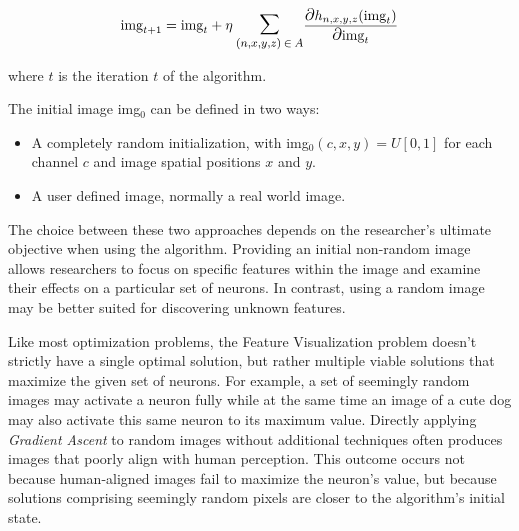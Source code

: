 \begin{equation}
    \text{img}_{t + 1} = \text{img}_t + \eta \: \mathlarger{\mathlarger{\sum}}_{(n, x, y, z) \: \in \: A} \frac{\mathlarger{\mathlarger{\partial}} h_{n, x, y, z} (\text{img}_t)}{\mathlarger{\mathlarger{\partial}} \text{img}_t}
    \label{eq:feat_vis_formula}
\end{equation}

\noindent where \(t\) is the iteration \(t\) of the algorithm. 

The initial image img\(_0\) can be defined in two ways:

\begin{itemize}
    \item A completely random initialization, with img\(_0(c, x, y) = U[0, 1]\) for each channel \(c\) and image spatial positions \(x\) and \(y\).
    \item A user defined image, normally a real world image.
\end{itemize}

The choice between these two approaches depends on the researcher's ultimate objective when using the algorithm.
Providing an initial non-random image allows researchers to focus on specific features within the image and examine their effects on a particular set of neurons. 
In contrast, using a random image may be better suited for discovering unknown features.

Like most optimization problems, the Feature Visualization problem doesn't strictly have a single optimal solution, but rather multiple viable solutions that maximize the given set of neurons.
For example, a set of seemingly random images may activate a neuron fully while at the same time an image of a cute dog may also activate this same neuron to its maximum value.
Directly applying \emph{Gradient Ascent} to random images without additional techniques often produces images that poorly align with human perception. This outcome occurs not because human-aligned images fail to maximize the neuron's value, but because solutions comprising seemingly random pixels are closer to the algorithm's initial state.

